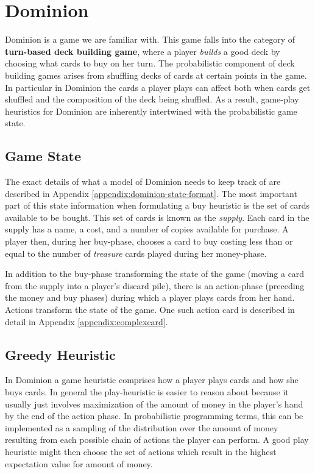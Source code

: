 
\section{Dominion} \label{sec:dom}

Dominion is a game we are familiar with. This game falls into the category of
{\bf turn-based
deck building game}, where a player \emph{builds} a good deck by choosing what
cards to buy on her turn. The probabilistic component of deck building games
arises from shuffling decks of cards at certain points in the game. In particular
in Dominion the cards a player plays can affect both when cards get shuffled
and the composition of the deck being shuffled. As a result, game-play heuristics
for Dominion are inherently intertwined with the probabilistic game state.

\subsection{Game State}

The exact details of what a model of Dominion needs to keep track of are
described in Appendix \ref{appendix:dominion-state-format}. The most important
part of this state information when formulating a buy heuristic is the set
of cards available to be bought. This set of cards is known as the \emph{supply}.
Each card in the supply has a name, a cost, and a number of copies available for
purchase. A player then, during her buy-phase, chooses a card to buy costing
less than or equal to the number of \emph{treasure} cards played during her
money-phase.

In addition to the buy-phase transforming the state of the game (moving a
card from the supply into a player's discard pile), there is an action-phase
(preceding the money and buy phases) during which a player plays cards
from her hand. Actions transform the state of the game. One
such action card is described in detail
in Appendix \ref{appendix:complexcard}.

\subsection{Greedy Heuristic} \label{sec:dom:heuristics}

In Dominion a game heuristic comprises how a player plays cards and how
she buys cards. In general the play-heuristic is easier to reason about
because it usually just involves maximization of the amount of money
in the player's hand by the end of the action phase. In probabilistic
programming terms, this can be implemented as a sampling of the
distribution over the amount of money resulting from each possible
chain of actions the player can perform. A good play heuristic might then
choose the set of actions which result in the highest expectation value
for amount of money.

